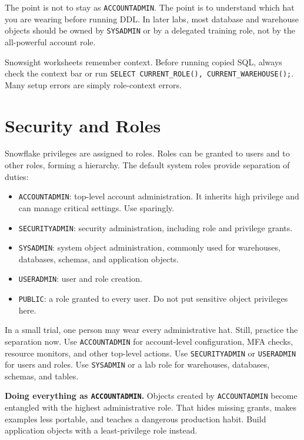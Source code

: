 The point is not to stay as \texttt{ACCOUNTADMIN}. The point is to understand which hat you are wearing before running DDL. In later labs, most database and warehouse objects should be owned by \texttt{SYSADMIN} or by a delegated training role, not by the all-powerful account role.

\begin{notebox}
Snowsight worksheets remember context. Before running copied SQL, always check the context bar or run \texttt{SELECT CURRENT\_ROLE(), CURRENT\_WAREHOUSE();}. Many setup errors are simply role-context errors.
\end{notebox}

\section{Security and Roles}
Snowflake privileges are assigned to roles. Roles can be granted to users and to other roles, forming a hierarchy. The default system roles provide separation of duties:
\begin{itemize}
    \item \texttt{ACCOUNTADMIN}: top-level account administration. It inherits high privilege and can manage critical settings. Use sparingly.
    \item \texttt{SECURITYADMIN}: security administration, including role and privilege grants.
    \item \texttt{SYSADMIN}: system object administration, commonly used for warehouses, databases, schemas, and application objects.
    \item \texttt{USERADMIN}: user and role creation.
    \item \texttt{PUBLIC}: a role granted to every user. Do not put sensitive object privileges here.
\end{itemize}

In a small trial, one person may wear every administrative hat. Still, practice the separation now. Use \texttt{ACCOUNTADMIN} for account-level configuration, MFA checks, resource monitors, and other top-level actions. Use \texttt{SECURITYADMIN} or \texttt{USERADMIN} for users and roles. Use \texttt{SYSADMIN} or a lab role for warehouses, databases, schemas, and tables.

\begin{pitfall}
\textbf{Doing everything as \texttt{ACCOUNTADMIN}.} Objects created by \texttt{ACCOUNTADMIN} become entangled with the highest administrative role. That hides missing grants, makes examples less portable, and teaches a dangerous production habit. Build application objects with a least-privilege role instead.
\end{pitfall}

